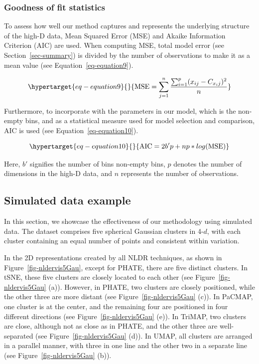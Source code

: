 \documentclass[
  12pt]{article}
\begin{document}
\hypertarget{sec-goodfit}{%
\subsubsection{Goodness of fit statistics}\label{sec-goodfit}}

To assess how well our method captures and represents the underlying
structure of the high-D data, Mean Squared Error (MSE) and Akaike
Information Criterion (AIC) are used. When computing MSE, total model
error (see Section~\ref{sec-summary}) is divided by the number of
observations to make it as a mean value (see
Equation~\ref{eq-equation9}).

\begin{equation}\protect\hypertarget{eq-equation9}{}{
\text{MSE} = \sum_{j = 1}^{n} \frac{\sum_{i = 1}^{p} (x_{ij} - C_{x_ij})^2}{n}
}\label{eq-equation9}\end{equation}

Furthermore, to incorporate with the parameters in our model, which is
the non-empty bins, and as a statistical measure used for model
selection and comparison, AIC is used (see
Equation~\ref{eq-equation10}).

\begin{equation}\protect\hypertarget{eq-equation10}{}{
\text{AIC} = 2b'p + np * log(\text{MSE})
}\label{eq-equation10}\end{equation}

Here, \(b'\) signifies the number of bins non-empty bins, \(p\) denotes
the number of dimensions in the high-D data, and \(n\) represents the
number of observations.

\hypertarget{sec-simpleex}{%
\subsection{Simulated data example}\label{sec-simpleex}}

In this section, we showcase the effectiveness of our methodology using
simulated data. The dataset comprises five spherical Gaussian clusters
in 4-\(d\), with each cluster containing an equal number of points and
consistent within variation.

In the 2D representations created by all NLDR techniques, as shown in
Figure~\ref{fig-nldervis5Gau}, except for PHATE, there are five distinct
clusters. In tSNE, these five clusters are closely located to each other
(see Figure~\ref{fig-nldervis5Gau} (a)). However, in PHATE, two clusters
are closely positioned, while the other three are more distant (see
Figure~\ref{fig-nldervis5Gau} (c)). In PaCMAP, one cluster is at the
center, and the remaining four are positioned in four different
directions (see Figure~\ref{fig-nldervis5Gau} (e)). In TriMAP, two
clusters are close, although not as close as in PHATE, and the other
three are well-separated (see Figure~\ref{fig-nldervis5Gau} (d)). In
UMAP, all clusters are arranged in a parallel manner, with three in one
line and the other two in a separate line (see
Figure~\ref{fig-nldervis5Gau} (b)).
\end{document}
